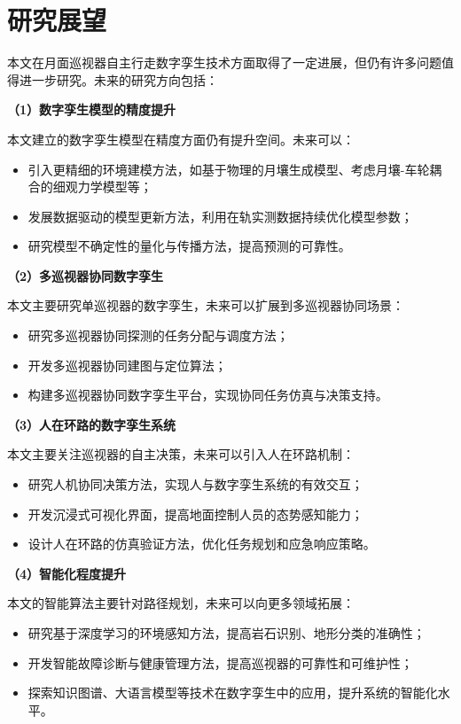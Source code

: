 \section{研究展望}
\label{sec:prospects}

本文在月面巡视器自主行走数字孪生技术方面取得了一定进展，但仍有许多问题值得进一步研究。未来的研究方向包括：

\textbf{（1）数字孪生模型的精度提升}

本文建立的数字孪生模型在精度方面仍有提升空间。未来可以：
\begin{itemize}
    \item 引入更精细的环境建模方法，如基于物理的月壤生成模型、考虑月壤-车轮耦合的细观力学模型等；
    \item 发展数据驱动的模型更新方法，利用在轨实测数据持续优化模型参数；
    \item 研究模型不确定性的量化与传播方法，提高预测的可靠性。
\end{itemize}

\textbf{（2）多巡视器协同数字孪生}

本文主要研究单巡视器的数字孪生，未来可以扩展到多巡视器协同场景：
\begin{itemize}
    \item 研究多巡视器协同探测的任务分配与调度方法；
    \item 开发多巡视器协同建图与定位算法；
    \item 构建多巡视器协同数字孪生平台，实现协同任务仿真与决策支持。
\end{itemize}

\textbf{（3）人在环路的数字孪生系统}

本文主要关注巡视器的自主决策，未来可以引入人在环路机制：
\begin{itemize}
    \item 研究人机协同决策方法，实现人与数字孪生系统的有效交互；
    \item 开发沉浸式可视化界面，提高地面控制人员的态势感知能力；
    \item 设计人在环路的仿真验证方法，优化任务规划和应急响应策略。
\end{itemize}

\textbf{（4）智能化程度提升}

本文的智能算法主要针对路径规划，未来可以向更多领域拓展：
\begin{itemize}
    \item 研究基于深度学习的环境感知方法，提高岩石识别、地形分类的准确性；
    \item 开发智能故障诊断与健康管理方法，提高巡视器的可靠性和可维护性；
    \item 探索知识图谱、大语言模型等技术在数字孪生中的应用，提升系统的智能化水平。
\end{itemize}

